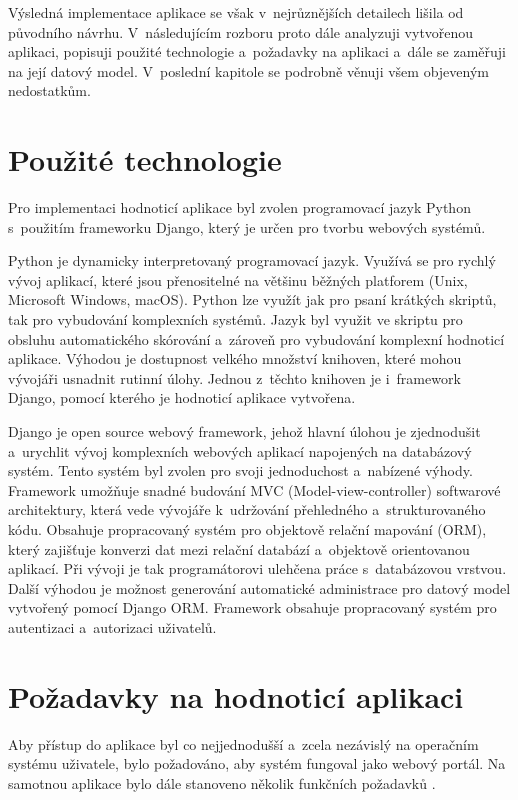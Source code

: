 \documentclass[
  digital,
  twoside,
  table, 
  nolof, 
  nolot
]{fithesis3}
\begin{document}
Výsledná implementace aplikace se však v~nejrůznějších detailech lišila od původního návrhu. V~následujícím rozboru proto dále analyzuji vytvořenou aplikaci, popisuji použité technologie a~požadavky na aplikaci a~dále se zaměřuji na její datový model. V~poslední kapitole se podrobně věnuji všem objeveným nedostatkům.

\section{Použité technologie}
Pro implementaci hodnoticí aplikace byl zvolen programovací jazyk Python s~použitím frameworku Django, který je určen pro tvorbu webových systémů. 

Python je dynamicky interpretovaný programovací jazyk. Využívá se pro rychlý vývoj aplikací, které jsou přenositelné na většinu běžných platforem (Unix, Microsoft Windows, macOS). Python lze využít jak pro psaní krátkých skriptů, tak pro vybudování komplexních systémů. Jazyk byl využit ve skriptu pro obsluhu automatického skórování a~zároveň pro vybudování komplexní hodnoticí aplikace. Výhodou je dostupnost velkého množství knihoven, které mohou vývojáři usnadnit rutinní úlohy. Jednou z~těchto knihoven je i~framework Django, pomocí kterého je hodnoticí aplikace vytvořena.

Django je open source webový framework, jehož hlavní úlohou je zjednodušit a~urychlit vývoj komplexních webových aplikací napojených na databázový systém. Tento systém byl zvolen pro svoji jednoduchost a~nabízené výhody. Framework umožňuje snadné budování MVC (Model-view-controller) softwarové architektury, která vede vývojáře k~udržování přehledného a~strukturovaného kódu. Obsahuje propracovaný systém pro objektově relační mapování (ORM), který zajišťuje konverzi dat mezi relační databází a~objektově orientovanou aplikací. Při vývoji je tak programátorovi ulehčena práce s~databázovou vrstvou. Další výhodou je možnost generování automatické administrace pro datový model vytvořený pomocí Django ORM. Framework obsahuje propracovaný systém pro autentizaci a~autorizaci uživatelů. 

\section{Požadavky na hodnoticí aplikaci}

Aby přístup do aplikace byl co nejjednodušší a~zcela nezávislý na operačním systému uživatele, bylo požadováno, aby systém fungoval jako webový portál. Na samotnou aplikace bylo dále stanoveno několik funkčních požadavků \cite{Kostelnik2016thesis}.
\end{document}
